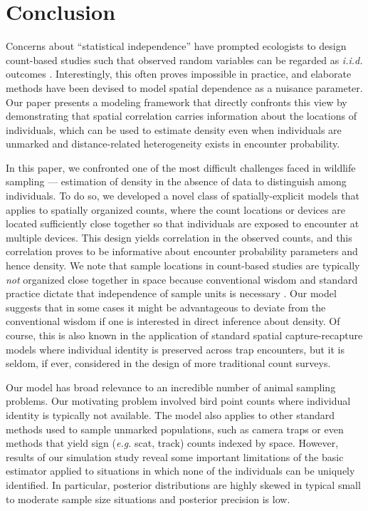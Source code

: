 \section{Conclusion}

Concerns about ``statistical independence'' have prompted
ecologists to design count-based studies such that observed
random variables can be regarded as {\it i.i.d.} outcomes
\citep{hurlbert:1984}. Interestingly, this
often proves impossible in practice, and elaborate
methods have been devised to model spatial dependence as a nuisance
parameter. Our paper presents a modeling framework that directly
confronts this view by demonstrating that spatial
correlation carries information about the locations of individuals,
which can be used to estimate density even when individuals
are unmarked and distance-related heterogeneity exists in encounter
probability.






In this paper, we confronted one of the most difficult challenges
faced in wildlife sampling ---
estimation of density in the absence of data to distinguish among
individuals. To do so, we developed a novel class of
spatially-explicit models that
applies to spatially organized counts, where the count locations or
devices are located sufficiently close together so that individuals
are exposed to encounter at multiple devices. This design yields
correlation in the observed counts, and this correlation proves to be
informative about encounter probability parameters and hence density.
We note that sample locations in count-based studies are typically
{\it not} organized close
together in space because conventional wisdom and standard practice
dictate that independence of sample units is necessary
\citep{hurlbert:1984}. Our model
suggests that in some cases it might be advantageous to deviate from
the conventional wisdom if one is interested in direct inference about
density. Of course, this is also known in the application of standard spatial
capture-recapture  models \citep{borchers_efford:2008}
where individual
identity is preserved across trap encounters, but it is seldom, if
ever, considered in the design of more traditional count surveys.

Our model has broad relevance to an incredible number of animal
sampling problems. Our motivating problem involved bird point counts
where individual
identity is typically not available. The model also applies
to other standard methods used to sample unmarked
populations,  such as camera traps
or even methods that yield sign ({\it e.g.} scat, track) counts
indexed by space. However, results of our simulation study reveal some
important limitations of the basic
estimator applied to situations in which none of the individuals can
be uniquely identified. In particular, posterior
distributions are highly skewed in typical small to moderate sample
size situations and posterior precision is low.

